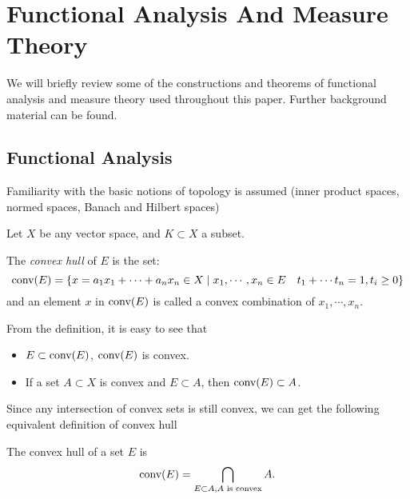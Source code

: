 \chapter{Functional Analysis And Measure Theory}
\label{app:function_measure}


We will briefly review some of the constructions and theorems of functional
analysis and measure theory used throughout this paper. Further background
material can be found.

\section{Functional Analysis}

Familiarity with the basic notions of topology is assumed (inner product
spaces, normed spaces, Banach and Hilbert spaces)



Let $X$ be any vector space, and $K \subset X$ a subset.

\begin{definition}
   \label{def:convex_hull}
   The \textit{convex hull} of $E$ is the set:
   \begin{equation}
      \textnormal{conv}(E) 
      = \{x = a_1x_1 + \cdots + a_nx_n \in X \mid 
      x_1, \cdots, x_n \in E \quad
      t_1 + \cdots t_n = 1, t_i \geq 0\}
   \end{equation}
   and an element $x$ in $\textnormal{conv}(E)$ is called a convex combination of $x_1,
   \cdots, x_n$.
\end{definition}

From the definition, it is easy to see that 
\begin{itemize}
   \item $E \subset \textnormal{conv}(E)$, $\textnormal{conv}(E)$ is convex.
   \item If a set $A \subset X$ is convex and $E \subset A$, then $\textnormal{conv}(E) \subset A$.
\end{itemize}

Since any intersection of convex sets is still convex, we can get the following equivalent definition of convex hull

\begin{proposition}
   The convex hull of a set $E$ is 
   \begin{equation}
      \textnormal{conv}(E) = \bigcap_{E \subset A, A \text{ is convex}} A.
   \end{equation}   
\end{proposition}

